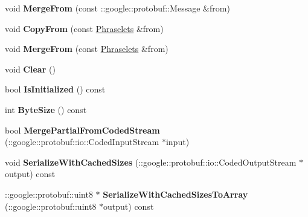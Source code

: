 \begin{DoxyCompactItemize}
\item 
\hypertarget{classlattice_1_1Phraselets_aea0701d2263901e124d9f4eb0ebb586e}{
void {\bfseries MergeFrom} (const ::google::protobuf::Message \&from)}
\label{classlattice_1_1Phraselets_aea0701d2263901e124d9f4eb0ebb586e}

\item 
\hypertarget{classlattice_1_1Phraselets_ac35d667378bb57992378580af8e2a42b}{
void {\bfseries CopyFrom} (const \hyperlink{classlattice_1_1Phraselets}{Phraselets} \&from)}
\label{classlattice_1_1Phraselets_ac35d667378bb57992378580af8e2a42b}

\item 
\hypertarget{classlattice_1_1Phraselets_a09cc9a5dad7bad0248ab26275d7d3151}{
void {\bfseries MergeFrom} (const \hyperlink{classlattice_1_1Phraselets}{Phraselets} \&from)}
\label{classlattice_1_1Phraselets_a09cc9a5dad7bad0248ab26275d7d3151}

\item 
\hypertarget{classlattice_1_1Phraselets_a4c735228e79edaf401ac7d08d35b53ac}{
void {\bfseries Clear} ()}
\label{classlattice_1_1Phraselets_a4c735228e79edaf401ac7d08d35b53ac}

\item 
\hypertarget{classlattice_1_1Phraselets_a4a9cdf5ab0725a87acb7831f572878ee}{
bool {\bfseries IsInitialized} () const }
\label{classlattice_1_1Phraselets_a4a9cdf5ab0725a87acb7831f572878ee}

\item 
\hypertarget{classlattice_1_1Phraselets_a26f51d307c09dc6a01c1c3a83afa898d}{
int {\bfseries ByteSize} () const }
\label{classlattice_1_1Phraselets_a26f51d307c09dc6a01c1c3a83afa898d}

\item 
\hypertarget{classlattice_1_1Phraselets_aa939d6bdfd0a634d857f62f92cacda8c}{
bool {\bfseries MergePartialFromCodedStream} (::google::protobuf::io::CodedInputStream $\ast$input)}
\label{classlattice_1_1Phraselets_aa939d6bdfd0a634d857f62f92cacda8c}

\item 
\hypertarget{classlattice_1_1Phraselets_a27a2c9b71879c29dfe115e4907abbc72}{
void {\bfseries SerializeWithCachedSizes} (::google::protobuf::io::CodedOutputStream $\ast$output) const }
\label{classlattice_1_1Phraselets_a27a2c9b71879c29dfe115e4907abbc72}

\item 
\hypertarget{classlattice_1_1Phraselets_ae292e770d079247584aeba13a4ff404a}{
::google::protobuf::uint8 $\ast$ {\bfseries SerializeWithCachedSizesToArray} (::google::protobuf::uint8 $\ast$output) const }
\label{classlattice_1_1Phraselets_ae292e770d079247584aeba13a4ff404a}


\end{DoxyCompactItemize}
